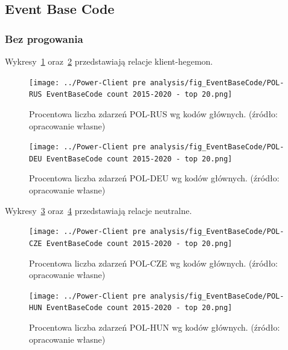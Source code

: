 \documentclass[11pt]{report}
\begin{document}
    \subsection{Event Base Code}

    \subsubsection{Bez progowania}\label{subsubsec:ebc:bez-progowania}

    Wykresy~\ref{fig:Power-Client:EBC:POL-RUS} oraz~\ref{fig:Power-Client:EBC:POL-DEU} przedstawiają relacje klient-hegemon.

    \begin{figure}[tp]
        \centering
        \texttt{[image: ../Power-Client pre analysis/fig\_EventBaseCode/POL-RUS EventBaseCode count 2015-2020 - top 20.png]}
        \caption{Procentowa liczba zdarzeń POL-RUS wg kodów głównych. (źródło: opracowanie własne)}
        \label{fig:Power-Client:EBC:POL-RUS}
    \end{figure}

    \begin{figure}[tp]
        \centering
        \texttt{[image: ../Power-Client pre analysis/fig\_EventBaseCode/POL-DEU EventBaseCode count 2015-2020 - top 20.png]}
        \caption{Procentowa liczba zdarzeń POL-DEU wg kodów głównych. (źródło: opracowanie własne)}
        \label{fig:Power-Client:EBC:POL-DEU}
    \end{figure}

    Wykresy~\ref{fig:Power-Client:EBC:POL-CZE} oraz~\ref{fig:Power-Client:EBC:POL-HUN} przedstawiają relacje neutralne.

    \begin{figure}[tp]
        \centering
        \texttt{[image: ../Power-Client pre analysis/fig\_EventBaseCode/POL-CZE EventBaseCode count 2015-2020 - top 20.png]}
        \caption{Procentowa liczba zdarzeń POL-CZE wg kodów głównych. (źródło: opracowanie własne)}
        \label{fig:Power-Client:EBC:POL-CZE}
    \end{figure}

    \begin{figure}[tp]
        \centering
        \texttt{[image: ../Power-Client pre analysis/fig\_EventBaseCode/POL-HUN EventBaseCode count 2015-2020 - top 20.png]}
        \caption{Procentowa liczba zdarzeń POL-HUN wg kodów głównych. (źródło: opracowanie własne)}
        \label{fig:Power-Client:EBC:POL-HUN}
    \end{figure}
\end{document}
